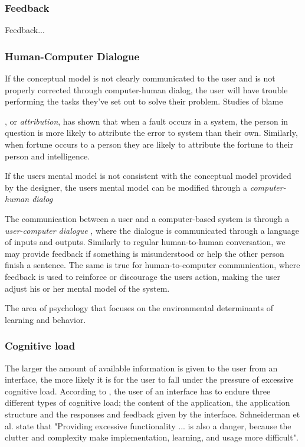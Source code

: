 \subsubsection{Feedback}
Feedback...

\subsubsection{Human-Computer Dialogue}

If the conceptual model is not clearly communicated to the user and is not properly corrected through computer-human dialog, the user will have trouble performing the tasks they've set out to solve their problem. Studies of blame , or \textit{attribution}, has shown that when a fault occurs in a system, the person in question is more likely to attribute the error to system than their own. Similarly, when fortune occurs to a person they are likely to attribute the fortune to their person and intelligence.

If the users mental model is not consistent with the conceptual model provided by the designer, the users mental model can be modified through a \textit{computer-human dialog}

The communication between a user and a computer-based system is through a \textit{user-computer dialogue} \cite{Foley1996}, where the dialogue is communicated through a language of inputs and outputs. Similarly to regular human-to-human conversation, we may provide feedback if something is misunderstood or help the other person finish a sentence. The same is true for human-to-computer communication, where feedback is used to reinforce or discourage the users action, making the user adjust his or her mental model of the system.

The area of psychology that focuses on the environmental determinants of learning and behavior.

\subsubsection{Cognitive load}
The larger the amount of available information is given to the user from an interface, the more likely it is for the user to fall under the pressure of excessive cognitive load. According to \cite{Jih1992}, the user of an interface has to endure three different types of cognitive load; the content of the application, the application structure and the responses and feedback given by the interface. Schneiderman et al. state that "Providing excessive functionality ... is also a danger, because the clutter and complexity make implementation, learning, and usage more difficult".

